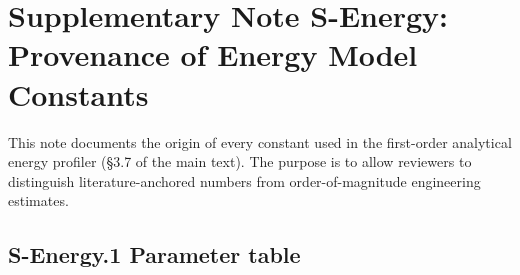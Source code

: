 
\section*{Supplementary Note S-Energy: Provenance of Energy Model Constants}
\label{supp:energy-provenance}

This note documents the origin of every constant used in the first-order analytical energy profiler (\S 3.7 of the main text).  The purpose is to allow reviewers to distinguish literature-anchored numbers from order-of-magnitude engineering estimates.

\subsection*{S-Energy.1 Parameter table}

